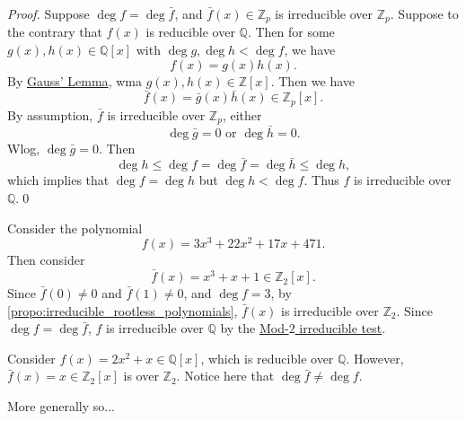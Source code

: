\documentclass[notoc,notitlepage]{tufte-book}
\begin{document}
\begin{proof}
  Suppose $\deg f = \deg \bar{f}$, and $\bar{f}(x) \in \mathbb{Z}_p$ is 
  irreducible over $\mathbb{Z}_p$. Suppose to the contrary that $f(x)$ is
  reducible over $\mathbb{Q}$. Then for some $g(x), h(x) \in \mathbb{Q}[x]$
  with $\deg g, \deg h < \deg f$, we have
  \begin{equation*}
    f(x) = g(x) h(x).
  \end{equation*}
  By \hyperref[thm:gauss_lemma]{Gauss' Lemma}, wma $g(x), h(x) \in \mathbb{Z}[x]$.
  Then we have
  \begin{equation*}
    \bar{f}(x) = \bar{g}(x) \bar{h}(x) \in \mathbb{Z}_p[x].
  \end{equation*}
  By assumption, $\bar{f}$ is irreducible over $\mathbb{Z}_p$, either
  \begin{equation*}
    \deg \bar{g} = 0 \text{ or } \deg \bar{h} = 0.
  \end{equation*}
  Wlog, $\deg \bar{g} = 0$. Then
  \begin{equation*}
    \deg h \leq \deg f = \deg \bar{f} = \deg \bar{h} \leq \deg h,
  \end{equation*}
  which implies that $\deg f = \deg h$ but $\deg h < \deg f$. Thus $f$ is irreducible
  over $\mathbb{Q}$.\qed\
\end{proof}

\begin{eg}
  Consider the polynomial
  \begin{equation*}
    f(x) = 3x^3 + 22x^2 + 17x + 471.
  \end{equation*}
  Then consider
  \begin{equation*}
    \bar{f}(x) = x^3 + x + 1 \in \mathbb{Z}_2[x].
  \end{equation*}
  Since $\bar{f}(0) \neq 0$ and $\bar{f}(1) \neq 0$, and $\deg f = 3$, by
  \cref{propo:irreducible_rootless_polynomials}, $\bar{f}(x)$ is irreducible over
  $\mathbb{Z}_2$. Since $\deg f = \deg \bar{f}$, $f$ is irreducible over $\mathbb{Q}$
  by the \hyperref[propo:mod_p_irreducibility_test]{Mod-$2$ irreducible test}.
\end{eg}

\begin{warning}
  Consider $f(x) = 2x^2 + x \in \mathbb{Q}[x]$, which is reducible over $\mathbb{Q}$.
  However, $\bar{f}(x) = x \in \mathbb{Z}_2[x]$ is \hlimpo{reducible} over $\mathbb{Z}_2$.
  Notice here that $\deg \bar{f} \neq \deg f$.
\end{warning}

More generally so...
\end{document}
